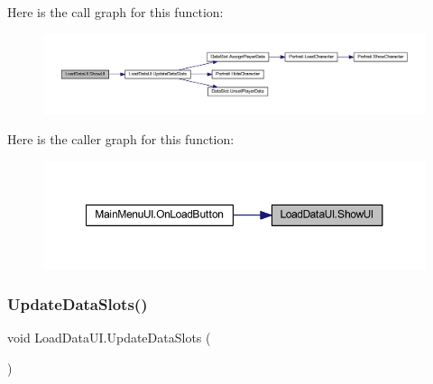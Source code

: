 Here is the call graph for this function\+:
\nopagebreak
\begin{figure}[H]
\begin{center}
\leavevmode
\includegraphics[width=350pt]{class_load_data_u_i_ac0ab99a18f93b2092d30e1ecea86154d_cgraph}
\end{center}
\end{figure}
Here is the caller graph for this function\+:
\nopagebreak
\begin{figure}[H]
\begin{center}
\leavevmode
\includegraphics[width=350pt]{class_load_data_u_i_ac0ab99a18f93b2092d30e1ecea86154d_icgraph}
\end{center}
\end{figure}
\mbox{\label{class_load_data_u_i_a2a36a17c6455a8ca8ee3b92dbbce0503}} 
\subsubsection{\texorpdfstring{UpdateDataSlots()}{UpdateDataSlots()}}
{\footnotesize\ttfamily void Load\+Data\+U\+I.\+Update\+Data\+Slots (\begin{DoxyParamCaption}{ }\end{DoxyParamCaption})}

